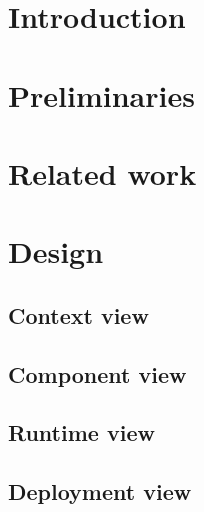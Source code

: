 \documentclass[
	11pt,
	a4paper,
	usegeometry,
	twoside,
	openright,
	toc=chapterentrywithdots
]{scrbook}
\begin{document}
	
	

	\restoregeometry
	
	\tableofcontents
	\thispagestyle{empty}
	\newpage
	
	\listoftodos
	\newpage
	
	\chapter{Introduction}
	
		
	
	\chapter{Preliminaries}
	
		
		
	\chapter{Related work}
	
	\chapter{Design}
		
		\section{Context view}
		
		
		\section{Component view}
		
		
		\section{Runtime view}
		
		
		\section{Deployment view}
		
\end{document}
